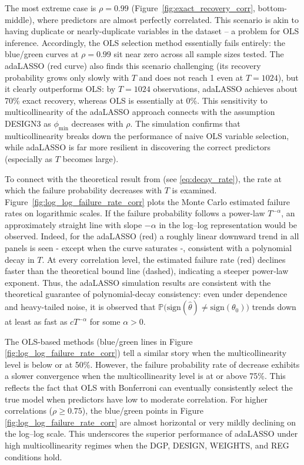 \documentclass[10pt,a4paper,oneside]{article}
\newcommand{\Prob}{\mathbb{P}}
\begin{document}
The most extreme case is $\rho=0.99$ (Figure~\ref{fig:exact_recovery_corr}, bottom-middle), where predictors are almost perfectly correlated. This scenario is akin to having duplicate or nearly-duplicate variables in the dataset – a problem for OLS inference. Accordingly, the OLS selection method essentially fails entirely: the blue/green curves at $\rho=0.99$ sit near zero across all sample sizes tested. The adaLASSO (red curve) also finds this scenario challenging (its recovery probability grows only slowly with $T$ and does not reach 1 even at $T = 1024$), but it clearly outperforms OLS: by $T = 1024$ observations, adaLASSO achieves about 70\% exact recovery, whereas OLS is essentially at 0\%. This sensitivity to multicollinearity of the adaLASSO approach connects with the assumption DESIGN3 as $\phi_{\mathrm{min}}$ decreases with $\rho$. The simulation confirms that multicollinearity breaks down the performance of naive OLS variable selection, while adaLASSO is far more resilient in discovering the correct predictors (especially as $T$ becomes large).

To connect with the theoretical result from \cite{MEDEIROS2016255} (see \ref{eq:decay_rate}), the rate at which the failure probability decreases with $T$ is examined. Figure~\ref{fig:log_log_failure_rate_corr} plots the Monte Carlo estimated failure rates on logarithmic scales. If the failure probability follows a power-law $T^{-\alpha}$, an approximately straight line with slope $-\alpha$ in the log–log representation would be observed. Indeed, for the adaLASSO (red) a roughly linear downward trend in all panels is seen - except when the curve saturates -, consistent with a polynomial decay in $T$. At every correlation level, the estimated failure rate (red) declines faster than the theoretical bound line (dashed), indicating a steeper power‑law exponent. Thus, the adaLASSO simulation results are consistent with the theoretical guarantee of polynomial-decay consistency: even under dependence and heavy-tailed noise, it is observed that $\Prob\bigl(\mathrm{sign}(\hat\theta)\neq\mathrm{sign}(\theta_0)\bigr)$ trends down at least as fast as $c T^{-\alpha}$ for some $\alpha>0$.

The OLS-based methods (blue/green lines in Figure \ref{fig:log_log_failure_rate_corr}) tell a similar story when the multicollinearity level is below or at 50\%. However, the failure probability rate of decrease exhibits a slower convergence when the multicollinearity level is at or above 75\%. This reflects the fact that OLS with Bonferroni can eventually consistently select the true model when predictors have low to moderate correlation. For higher correlations ($\rho \geq 0.75$), the blue/green points in Figure \ref{fig:log_log_failure_rate_corr} are almost horizontal or very mildly declining on the log–log scale. This underscores the superior performance of adaLASSO under high multicollinearity regimes when the DGP, DESIGN, WEIGHTS, and REG conditions hold.
\end{document}
